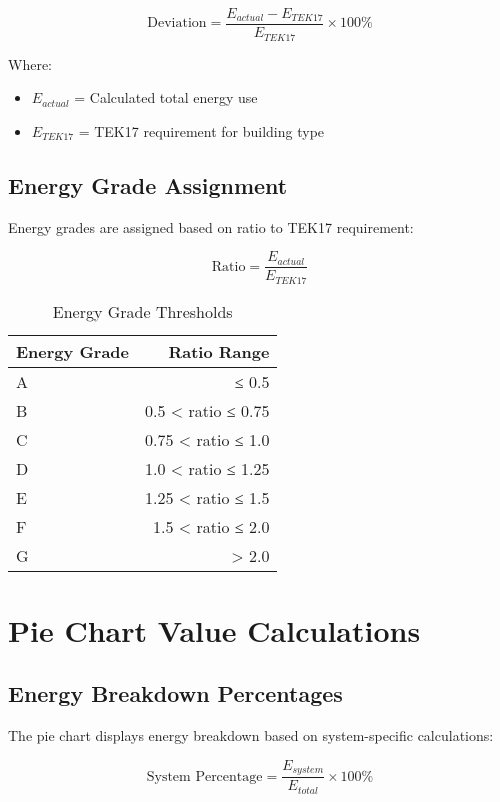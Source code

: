 \documentclass[12pt,a4paper]{article}
\begin{document}
\begin{equation}
\text{Deviation} = \frac{E_{actual} - E_{TEK17}}{E_{TEK17}} \times 100\%
\end{equation}

Where:
\begin{itemize}
\item $E_{actual}$ = Calculated total energy use
\item $E_{TEK17}$ = TEK17 requirement for building type
\end{itemize}

\subsection{Energy Grade Assignment}

Energy grades are assigned based on ratio to TEK17 requirement:

\begin{equation}
\text{Ratio} = \frac{E_{actual}}{E_{TEK17}}
\end{equation}

\begin{table}[H]
\centering
\begin{tabular}{|l|r|}
\hline
\textbf{Energy Grade} & \textbf{Ratio Range} \\
\hline
A & ≤ 0.5 \\
B & 0.5 < ratio ≤ 0.75 \\
C & 0.75 < ratio ≤ 1.0 \\
D & 1.0 < ratio ≤ 1.25 \\
E & 1.25 < ratio ≤ 1.5 \\
F & 1.5 < ratio ≤ 2.0 \\
G & > 2.0 \\
\hline
\end{tabular}
\caption{Energy Grade Thresholds}
\end{table}

\section{Pie Chart Value Calculations}

\subsection{Energy Breakdown Percentages}

The pie chart displays energy breakdown based on system-specific calculations:

\begin{equation}
\text{System Percentage} = \frac{E_{system}}{E_{total}} \times 100\%
\end{equation}
\end{document}
